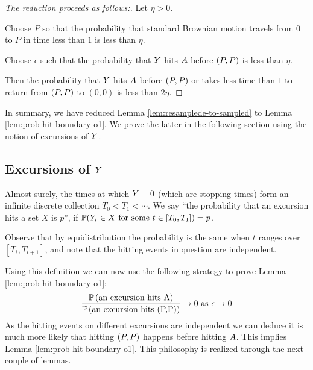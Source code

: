 {\newcommand{\origin}{(0,0)}

\begin{proof}[The reduction proceeds as follows:]

  Let $\eta > 0$.

  Choose $P$ so that the probability that standard Brownian motion
  travels from $0$ to $P$ in time less than $1$ is less than
  $\eta$.

  Choose $\epsilon$ such that the probability that $Y$ hits
  $A$ before $(P,P)$ is less than $\eta$.

  Then the probability that $Y$ hits $A$ before $(P,P)$
  or takes less time than $1$ to return from $(P,P)$ to $\origin$ is
  less than $2\eta$.

\end{proof}

In summary, we have reduced Lemma \ref{lem:resamplede-to-sampled} to
Lemma \ref{lem:prob-hit-boundary-o1}. We prove the latter in the
following section using the notion of excursions of $Y$.

\subsection{Excursions of $Y$}

{
  \newcommand{\excursionstart}{T}
  Almost surely, the times at which $Y = 0$ (which are stopping
  times) form an infinite discrete collection $\excursionstart_0 <
  \excursionstart_1 < \cdots$. We say ``the probability that an excursion
  hits a set $X$ is $p$'', if $\P(\twodim_t\in X \text{
  for some } t\in [\excursionstart_0, \excursionstart_{1}]) = p$.
    
  Observe that by equidistribution the probability is the same when 
  $t$ ranges over $[\excursionstart_i, \excursionstart_{i+1}]$, and 
  note that the hitting events in question are independent.
}

\newcommand{\probexcursionhits}[1]{\P\left(\text{an excursion hits #1}\right)}

Using this definition we can now use the following strategy to
prove Lemma \ref{lem:prob-hit-boundary-o1}:
\[
\frac{\probexcursionhits{\boundarylines}}
     {\probexcursionhits{\farpoint}}
        \to 0 \text{ as } \epsilon\to0
\]
As the hitting events on different excursions are independent we
can deduce it is much more likely that hitting $(P,P)$ happens
before hitting $A$. This implies Lemma
\ref{lem:prob-hit-boundary-o1}. This philosophy is 
realized through the next couple of lemmas.

}
